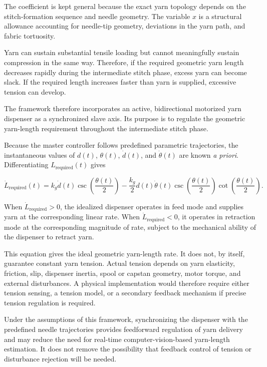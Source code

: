 \documentclass[12pt, a4paper]{article}
\begin{document}
The coefficient is kept general because the exact yarn topology depends on the stitch-formation sequence and needle geometry. The variable $x$ is a structural allowance accounting for needle-tip geometry, deviations in the yarn path, and fabric tortuosity.

Yarn can sustain substantial tensile loading but cannot meaningfully sustain compression in the same way. Therefore, if the required geometric yarn length decreases rapidly during the intermediate stitch phase, excess yarn can become slack. If the required length increases faster than yarn is supplied, excessive tension can develop.

The framework therefore incorporates an active, bidirectional motorized yarn dispenser as a synchronized slave axis. Its purpose is to regulate the geometric yarn-length requirement throughout the intermediate stitch phase.

Because the master controller follows predefined parametric trajectories, the instantaneous values of $d(t)$, $\theta(t)$, $\dot{d}(t)$, and $\dot{\theta}(t)$ are known \emph{a priori}. Differentiating $L_{\text{required}}(t)$ gives

\begin{equation}
\dot{L}_{\text{required}}(t)
=
k_g\dot{d}(t)
\csc\left(\frac{\theta(t)}{2}\right)
-
\frac{k_g}{2}
d(t)\dot{\theta}(t)
\csc\left(\frac{\theta(t)}{2}\right)
\cot\left(\frac{\theta(t)}{2}\right).
\end{equation}

When $\dot{L}_{\text{required}}>0$, the idealized dispenser operates in feed mode and supplies yarn at the corresponding linear rate. When $\dot{L}_{\text{required}}<0$, it operates in retraction mode at the corresponding magnitude of rate, subject to the mechanical ability of the dispenser to retract yarn.

This equation gives the ideal geometric yarn-length rate. It does not, by itself, guarantee constant yarn tension. Actual tension depends on yarn elasticity, friction, slip, dispenser inertia, spool or capstan geometry, motor torque, and external disturbances. A physical implementation would therefore require either tension sensing, a tension model, or a secondary feedback mechanism if precise tension regulation is required.

Under the assumptions of this framework, synchronizing the dispenser with the predefined needle trajectories provides feedforward regulation of yarn delivery and may reduce the need for real-time computer-vision-based yarn-length estimation. It does not remove the possibility that feedback control of tension or disturbance rejection will be needed.
\end{document}
